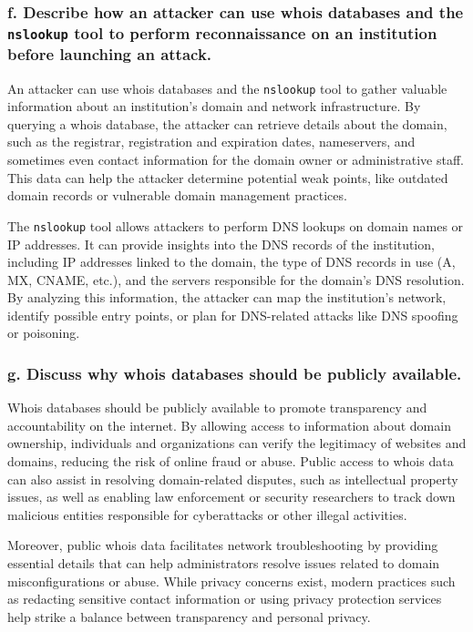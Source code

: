 \documentclass{cshwk}
\begin{document}
\subsubsection*{f. Describe how an attacker can use whois databases and the \texttt{nslookup} tool to perform reconnaissance on an institution before launching an attack.}

An attacker can use whois databases and the \texttt{nslookup} tool to gather valuable information about an institution’s domain and network infrastructure. By querying a whois database, the attacker can retrieve details about the domain, such as the registrar, registration and expiration dates, nameservers, and sometimes even contact information for the domain owner or administrative staff. This data can help the attacker determine potential weak points, like outdated domain records or vulnerable domain management practices.

The \texttt{nslookup} tool allows attackers to perform DNS lookups on domain names or IP addresses. It can provide insights into the DNS records of the institution, including IP addresses linked to the domain, the type of DNS records in use (A, MX, CNAME, etc.), and the servers responsible for the domain’s DNS resolution. By analyzing this information, the attacker can map the institution's network, identify possible entry points, or plan for DNS-related attacks like DNS spoofing or poisoning.

\subsubsection*{g. Discuss why whois databases should be publicly available.}

Whois databases should be publicly available to promote transparency and accountability on the internet. By allowing access to information about domain ownership, individuals and organizations can verify the legitimacy of websites and domains, reducing the risk of online fraud or abuse. Public access to whois data can also assist in resolving domain-related disputes, such as intellectual property issues, as well as enabling law enforcement or security researchers to track down malicious entities responsible for cyberattacks or other illegal activities.

Moreover, public whois data facilitates network troubleshooting by providing essential details that can help administrators resolve issues related to domain misconfigurations or abuse. While privacy concerns exist, modern practices such as redacting sensitive contact information or using privacy protection services help strike a balance between transparency and personal privacy.
\end{document}
